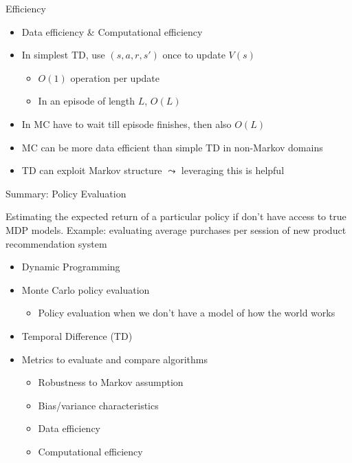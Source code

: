 \documentclass[aspectratio=169]{../latex_main/tntbeamer}  %
\begin{document}
\begin{frame}[c]{Efficiency}
	
	\begin{itemize}
		\item Data efficiency \& Computational efficiency
		\item In simplest TD, use $(s,a,r,s')$ once to update $V(s)$
		\begin{itemize}
			\item $O(1)$ operation per update
			\item In an episode of length $L$, $O(L)$
		\end{itemize}		
		\item In MC have to wait till episode finishes, then also $O(L)$
		\item MC can be more data efficient than simple TD in non-Markov domains
		\item TD can exploit Markov structure $\leadsto$ leveraging this is helpful
	\end{itemize}
	
\end{frame}
\begin{frame}[c]{Summary: Policy Evaluation}
	
	Estimating the expected return of a particular policy if don’t have access to true MDP models. Example: evaluating average purchases per session of new product recommendation system
	
	\begin{itemize}
		\item Dynamic Programming
		\item Monte Carlo policy evaluation
		\begin{itemize}
			\item Policy evaluation when we don’t have a model of how the world works
		\end{itemize}
		\item Temporal Difference (TD)
		\item Metrics to evaluate and compare algorithms
		\begin{itemize}
			\item Robustness to Markov assumption
			\item Bias/variance characteristics
			\item Data efficiency
			\item Computational efficiency
		\end{itemize}
	\end{itemize}

	
\end{frame}



\end{document}
